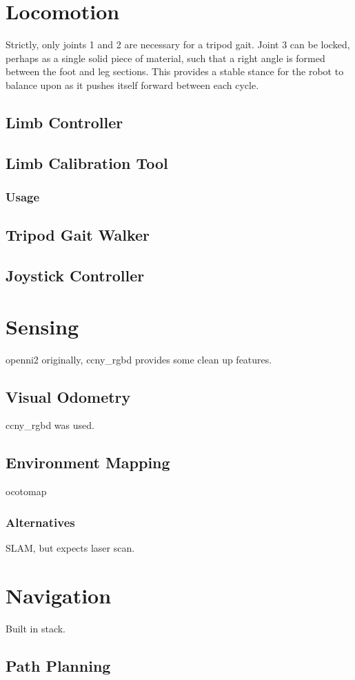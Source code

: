 \section{Locomotion}

Strictly, only joints 1 and 2 are necessary for a tripod gait. Joint 3 can be locked, perhaps as a single solid piece of material, such that a right angle is formed between the foot and leg sections. This provides a stable stance for the robot to balance upon as it pushes itself forward between each cycle.

\subsection{Limb Controller}
\subsection{Limb Calibration Tool}
\subsubsection{Usage}

\subsection{Tripod Gait Walker}
\subsection{Joystick Controller}


\section{Sensing}

openni2 originally, ccny\_rgbd \cite{ccny_rgbd} provides some clean up features.

\subsection{Visual Odometry}

ccny\_rgbd \cite{ccny_rgbd} was used.

\subsection{Environment Mapping}

ocotomap

\subsubsection{Alternatives}

SLAM, but expects laser scan.


\section{Navigation}

Built in stack.

\subsection{Path Planning}
